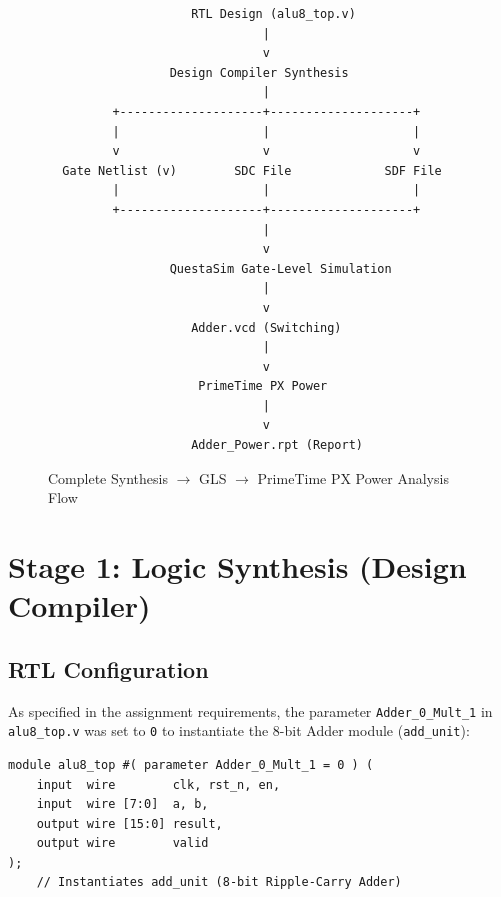 \documentclass[12pt,a4paper]{article}
\begin{document}
\begin{figure}[H]
\centering
\begin{verbatim}
                    RTL Design (alu8_top.v)
                              |
                              v
                 Design Compiler Synthesis
                              |
         +--------------------+--------------------+
         |                    |                    |
         v                    v                    v
  Gate Netlist (v)        SDC File             SDF File
         |                    |                    |
         +--------------------+--------------------+
                              |
                              v
                 QuestaSim Gate-Level Simulation
                              |
                              v
                    Adder.vcd (Switching)
                              |
                              v
                     PrimeTime PX Power
                              |
                              v
                    Adder_Power.rpt (Report)
\end{verbatim}
\caption{Complete Synthesis $\to$ GLS $\to$ PrimeTime PX Power Analysis Flow}
\end{figure}

\section{Stage 1: Logic Synthesis (Design Compiler)}

\subsection{RTL Configuration}
As specified in the assignment requirements, the parameter \texttt{Adder\_0\_Mult\_1} in \texttt{alu8\_top.v} was set to \texttt{0} to instantiate the 8-bit Adder module (\texttt{add\_unit}):

\begin{lstlisting}[style=logstyle, caption={RTL Configuration in alu8\_top.v}]
module alu8_top #( parameter Adder_0_Mult_1 = 0 ) (
    input  wire        clk, rst_n, en,    
    input  wire [7:0]  a, b,
    output wire [15:0] result,
    output wire        valid
);
    // Instantiates add_unit (8-bit Ripple-Carry Adder)
\end{lstlisting}
\end{document}
